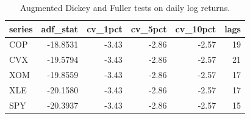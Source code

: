 \begin{table}[ht]
\centering
\caption{Augmented Dickey and Fuller tests on daily log returns.} 
\label{tab:adf_returns}
\begin{tabular}{lrrrrr}
  \toprule
series & adf\_stat & cv\_1pct & cv\_5pct & cv\_10pct & lags \\ 
  \midrule
COP & -18.8531 & -3.43 & -2.86 & -2.57 & 19 \\ 
  CVX & -19.5794 & -3.43 & -2.86 & -2.57 & 21 \\ 
  XOM & -19.8559 & -3.43 & -2.86 & -2.57 & 17 \\ 
  XLE & -20.1580 & -3.43 & -2.86 & -2.57 & 17 \\ 
  SPY & -20.3937 & -3.43 & -2.86 & -2.57 & 15 \\ 
   \bottomrule
\end{tabular}
\end{table}

